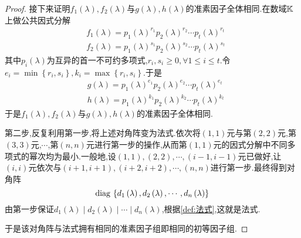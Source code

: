 {\begin{proof}
        接下来证明$f_1\left(\lambda\right),f_2\left(\lambda\right)$与$g\left(\lambda\right),h\left(\lambda\right)$的准素因子全体相同.在数域$\mathbb{K} $上做公共因式分解\begin{align*}
             & f_1\left(\lambda\right)=p_1\left(\lambda\right)^{r_1}p_2\left(\lambda\right)^{r_2}\cdots p_t\left(\lambda\right)^{r_t} \\
             & f_2\left(\lambda\right)=p_1\left(\lambda\right)^{s_1}p_2\left(\lambda\right)^{s_2}\cdots p_t\left(\lambda\right)^{s_t}
        \end{align*}其中$p_i\left(\lambda\right)$为互异的首一不可约多项式,$r_i,s_i\geqslant 0,\forall 1\leqslant i\leqslant t.$令$e_i=\min\left\{r_i,s_i\right\},k_i=\max\left\{r_i,s_i\right\}.$于是
        \begin{align*}
             & g\left(\lambda\right)=p_1\left(\lambda\right)^{e_1}p_2\left(\lambda\right)^{e_2}\cdots p_t\left(\lambda\right)^{e_t} \\
             & h\left(\lambda\right)=p_1\left(\lambda\right)^{k_1}p_2\left(\lambda\right)^{k_2}\cdots p_t\left(\lambda\right)^{k_t}
        \end{align*}于是$f_1\left(\lambda\right),f_2\left(\lambda\right)$与$g\left(\lambda\right),h\left(\lambda\right)$的准素因子全体相同.

        第二步,反复利用第一步,将上述对角阵变为法式.依次将$\left(1,1\right)$元与第$\left(2,2\right)$元,第$\left(3,3\right)$元,$\cdots$,第$\left(n,n\right)$元进行第一步的操作,从而第$\left(1,1\right)$元的因式分解中不同多项式的幂次均为最小.一般地,设$\left(1,1\right),\left(2,2\right),\cdots,\left(i-1,i-1\right)$元已做好,让$\left(i,i\right)$元依次与$\left(i+1,i+1\right),\left(i+2,i+2\right),\cdots,\left(n,n\right)$进行第一步.最终得到对角阵\[
            \operatorname{diag\,} \left\{
            d_1\left(\lambda\right),d_2\left(\lambda\right),\cdots,d_n\left(\lambda\right)
            \right\}
        \]由第一步保证$d_1\left(\lambda\right)\mid d_2\left(\lambda\right)\mid \cdots\mid d_n\left(\lambda\right)$,根据\cref{def:法式},这就是法式.

        于是该对角阵与法式拥有相同的准素因子组即相同的初等因子组.
    \end{proof}
}
